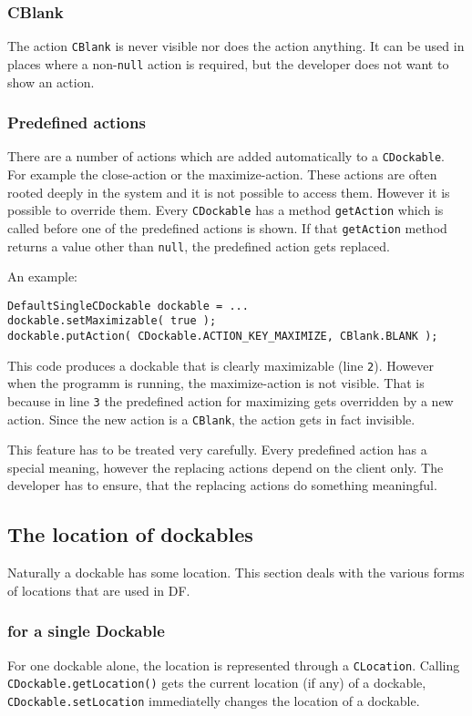 \documentclass[a4paper,10pt]{article}
\newcommand{\src}[1]{\lstinline[basicstyle=\ttfamily]|#1|}
\begin{document}
\subsubsection{CBlank}
The action \src{CBlank} is never visible nor does the action anything. It can be used in places where a non-\src{null} action is required, but the developer does not want to show an action.

\subsubsection{Predefined actions}
There are a number of actions which are added automatically to a \src{CDockable}. For example the close-action or the maximize-action. These actions are often rooted deeply in the system and it is not possible to access them. However it is possible to override them. Every \src{CDockable} has a method \src{getAction} which is called before one of the predefined actions is shown. If that \src{getAction} method returns a value other than \src{null}, the predefined action gets replaced.

An example:
\begin{lstlisting}
DefaultSingleCDockable dockable = ...
dockable.setMaximizable( true );
dockable.putAction( CDockable.ACTION_KEY_MAXIMIZE, CBlank.BLANK );
\end{lstlisting}
This code produces a dockable that is clearly maximizable (line \src{2}). However when the programm is running, the maximize-action is not visible. That is because in line \src{3} the predefined action for maximizing gets overridden by a new action. Since the new action is a \src{CBlank}, the action gets in fact invisible.

This feature has to be treated very carefully. Every predefined action has a special meaning, however the replacing actions depend on the client only. The developer has to ensure, that the replacing actions do something meaningful.

\subsection{The location of dockables}
Naturally a dockable has some location. This section deals with the various forms of locations that are used in DF.

\subsubsection{for a single Dockable}
For one dockable alone, the location is represented through a \src{CLocation}. Calling \src{CDockable.getLocation()} gets the current location (if any) of a dockable, \src{CDockable.setLocation} immediatelly changes the location of a dockable.
\end{document}
